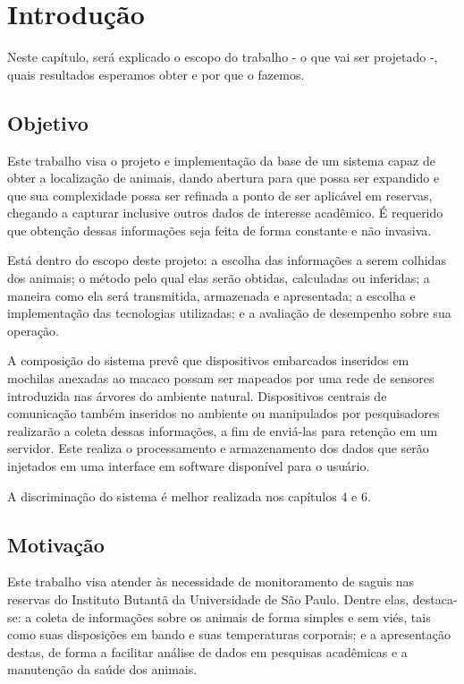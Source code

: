 \chapter{Introdução}
Neste capítulo, será explicado o escopo do trabalho - o que vai ser projetado -, quais resultados esperamos obter e por que o fazemos.
	
\section{Objetivo}
Este trabalho visa o projeto e implementação da base de um sistema capaz de obter a localização de animais, dando abertura para que possa ser expandido e que sua complexidade possa ser refinada a ponto de ser aplicável em reservas, chegando a capturar inclusive outros dados de interesse acadêmico. É requerido que obtenção dessas informações seja feita de forma constante e não invasiva.

Está dentro do escopo deste projeto: a escolha das informações a serem colhidas dos animais; o método pelo qual elas serão obtidas, calculadas ou inferidas; a maneira como ela será transmitida, armazenada e apresentada; a escolha e implementação das tecnologias utilizadas; e a avaliação de desempenho sobre sua operação.

A composição do sistema prevê que dispositivos embarcados inseridos em mochilas anexadas ao macaco possam ser mapeados por uma rede de sensores introduzida nas árvores do ambiente natural. Dispositivos centrais de comunicação também inseridos no ambiente ou manipulados por pesquisadores realizarão a coleta dessas informações, a fim de enviá-las para retenção em um servidor. Este realiza o processamento e armazenamento dos dados que serão injetados em uma interface em software disponível para o usuário.

A discriminação do sistema é melhor realizada nos capítulos 4 e 6.

\section{Motivação}
Este trabalho visa atender às necessidade de monitoramento de saguis nas reservas do Instituto Butantã da Universidade de São Paulo. Dentre elas, destaca-se: a coleta de informações sobre os animais de forma simples e sem viés, tais como suas disposições em bando e suas temperaturas corporais; e a apresentação destas, de forma a facilitar análise de dados em  pesquisas acadêmicas e a manutenção da saúde dos animais.

